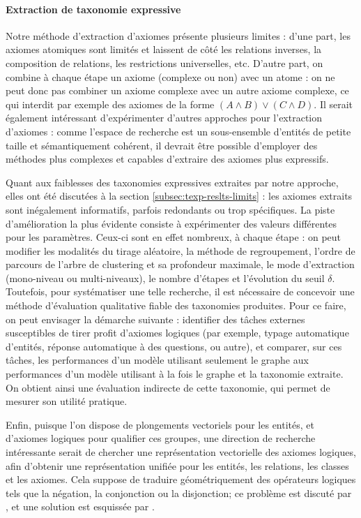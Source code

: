 \paragraph{Extraction de taxonomie expressive}


Notre méthode d'extraction d'axiomes présente plusieurs limites : d'une part, les axiomes atomiques sont limités et laissent de côté les relations inverses, la composition de relations, les restrictions universelles, etc. D'autre part, on combine à chaque étape un axiome (complexe ou non) avec un atome : on ne peut donc pas combiner un axiome complexe avec un autre axiome complexe, ce qui interdit par exemple des axiomes de la forme $(A \land B) \lor (C \land D)$. Il serait également intéressant d'expérimenter d'autres approches pour l'extraction d'axiomes : comme l'espace de recherche est un sous-ensemble d'entités de petite taille et sémantiquement cohérent, il devrait être possible d'employer des méthodes plus complexes et capables d'extraire des axiomes plus expressifs.

Quant aux faiblesses des taxonomies expressives extraites par notre approche, elles ont été discutées à la section \ref{subsec:texp-reslts-limits} : les axiomes extraits sont inégalement informatifs, parfois redondants ou trop spécifiques. La piste d'amélioration la plus évidente consiste à expérimenter des valeurs différentes pour les paramètres. Ceux-ci sont en effet nombreux, à chaque étape : on peut modifier les modalités du tirage aléatoire, la méthode de regroupement, l'ordre de parcours de l'arbre de clustering et sa profondeur maximale, le mode d'extraction (mono-niveau ou multi-niveaux), le nombre d'étapes et l'évolution du seuil $\delta$. Toutefois, pour systématiser une telle recherche, il est nécessaire de concevoir une méthode d'évaluation qualitative fiable des taxonomies produites. Pour ce faire, on peut envisager la démarche suivante : identifier des tâches externes susceptibles de tirer profit d'axiomes logiques (par exemple, typage automatique d'entités, réponse automatique à des questions, ou autre), et comparer, sur ces tâches, les performances d'un modèle utilisant seulement le graphe aux performances d'un modèle utilisant à la fois le graphe et la taxonomie extraite. On obtient ainsi une évaluation indirecte de cette taxonomie, qui permet de mesurer son utilité pratique.



Enfin, puisque l'on dispose de plongements vectoriels pour les entités, et d'axiomes logiques pour qualifier ces groupes, une direction de recherche intéressante serait de chercher une représentation vectorielle des axiomes logiques, afin d'obtenir une représentation unifiée pour les entités, les relations, les classes et les axiomes. 
Cela suppose de traduire géométriquement des opérateurs logiques tels que la négation, la conjonction ou la disjonction; ce problème est discuté par
\cite{gutierrez2018knowledge}, et une solution est esquissée par \cite{hao2019universal}.
